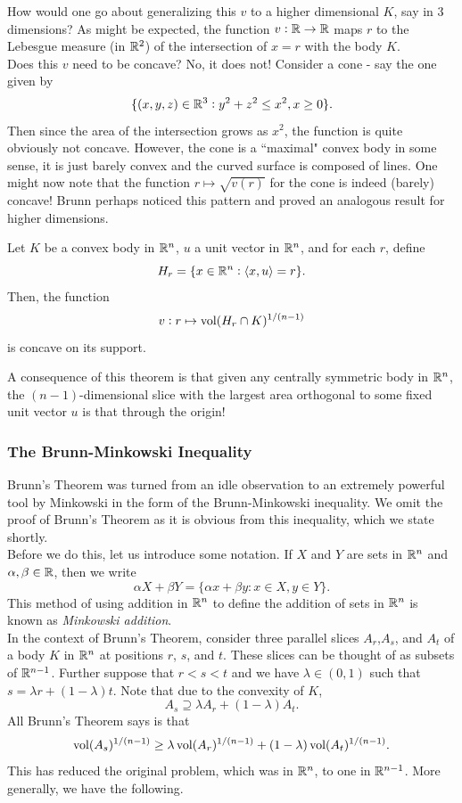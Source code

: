 How would one go about generalizing this $v$ to a higher dimensional $K$, say in $3$ dimensions? As might be expected, the function $v:\mathbb{R}\to\mathbb{R}$ maps $r$ to the Lebesgue measure (in $\mathbb{R}^2$) of the intersection of $x=r$ with the body $K$.\\
Does this $v$ need to be concave? No, it does not! Consider a cone - say the one given by
\[\{(x,y,z)\in\mathbb{R}^3 : y^2+z^2\leq x^2, x\geq 0\}.\]
Then since the area of the intersection grows as $x^2$, the function is quite obviously not concave. However, the cone is a ``maximal" convex body in some sense, it is just barely convex and the curved surface is composed of lines. One might now note that the function $r\mapsto \sqrt{v(r)}$ for the cone is indeed (barely) concave! Brunn perhaps noticed this pattern and proved an analogous result for higher dimensions.

\begin{ftheo}
\label{brunn's theorem}
Let $K$ be a convex body in $\mathbb{R}^n$, $u$ a unit vector in $\mathbb{R}^n$, and for each $r$, define
\[ H_r = \{x\in\mathbb{R}^n : \langle x,u\rangle = r\}. \]
Then, the function
\[ v:r\mapsto \operatorname{vol}(H_r\cap K)^{1/(n-1)} \]
is concave on its support.
\end{ftheo}

A consequence of this theorem is that given any centrally symmetric body in $\mathbb{R}^n$, the $(n-1)$-dimensional slice with the largest area orthogonal to some fixed unit vector $u$ is that through the origin!

\subsubsection{The Brunn-Minkowski Inequality}

Brunn's Theorem was turned from an idle observation to an extremely powerful tool by Minkowski in the form of the Brunn-Minkowski inequality. We omit the proof of Brunn's Theorem as it is obvious from this inequality, which we state shortly.\\

Before we do this, let us introduce some notation. If $X$ and $Y$ are sets in $\mathbb{R}^n$ and $\alpha,\beta\in\mathbb{R}$, then we write
\[ \alpha X + \beta Y = \{ \alpha x + \beta y : x \in X, y \in Y \}. \]
This method of using addition in $\mathbb{R}^n$ to define the addition of sets in $\mathbb{R}^n$ is known as \textit{Minkowski addition}.\\
In the context of Brunn's Theorem, consider three parallel slices $A_r$,$A_s$, and $A_t$ of a body $K$ in $\mathbb{R}^n$ at positions $r$, $s$, and $t$. These slices can be thought of as subsets of $\mathbb{R}^{n-1}$. Further suppose that $r<s<t$ and we have $\lambda\in(0,1)$ such that $s = \lambda r + (1-\lambda)t$. Note that due to the convexity of $K$, 
\[A_s \supseteq \lambda A_r + (1-\lambda)A_t.\]
All Brunn's Theorem says is that
\[ \operatorname{vol}(A_s)^{1/(n-1)} \geq \lambda \operatorname{vol}(A_r)^{1/(n-1)} + (1-\lambda) \operatorname{vol}(A_t)^{1/(n-1)}. \]
This has reduced the original problem, which was in $\mathbb{R}^n$, to one in $\mathbb{R}^{n-1}$. More generally, we have the following.

